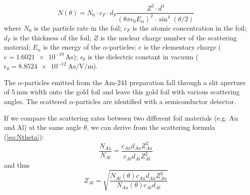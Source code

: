 \documentclass[%
 reprint,
nofootinbib,
 amsmath,amssymb,
 aps,
floatfix,
]{revtex4-2}
\begin{document}
    \begin{equation}
    \label{eq:Ntheta}
        N (\theta) = N_0 \cdot c_F \cdot d_F \dfrac{Z^2 \cdot d^4}{(8 \pi \epsilon_0 E_{\alpha})^2 \cdot \sin^4 (\theta/2)}
    \end{equation}
    where $N_0$ is the particle rate in the foil; $c_F$ is the atomic concentration in the foil; $d_F$ is the thickness of the foil; $Z$ is the nuclear charge number of the scattering material; $E_{\alpha}$ is the energy of the $\alpha$-particles; $e$ is the elementary charge ($e = \SI{1.6021e-19}{\ampere \second}$); $\epsilon_0$ is the dielectric constant in vacuum ($\epsilon_0 = \SI{8.8524e-12}{\ampere \second \per \volt \per \metre}$).
    \par
    The $\alpha$-particles emitted from the Am-241 preparation fall through a slit aperture of $\SI{5}{\milli \metre}$ width onto the gold foil and leave this gold foil with various scattering angles. The scattered $\alpha$-particles are identified with a semiconductor detector.
    \par
    If we compare the scattering rates between two different foil materials (e.g. Au and Al) at the same angle $\theta$, we can derive from the scattering formula (\ref{eq:Ntheta}):
    \begin{equation}
        \dfrac{N_{Au}}{N_{Al}} = \dfrac{c_{Au} d_{Au} Z^2_{Au}}{c_{Al} d_{Al} Z^2_{Al}}
    \end{equation}
    and thus
    \begin{equation}
    \label{eq:Zal}
        Z_{Al} = \sqrt{\dfrac{N_{Al}(\theta) c_{Au} d_{Au} Z^2_{Au}}{N_{Au}(\theta) c_{Al} d_{Al}}}
    \end{equation}


    
    
\end{document}
